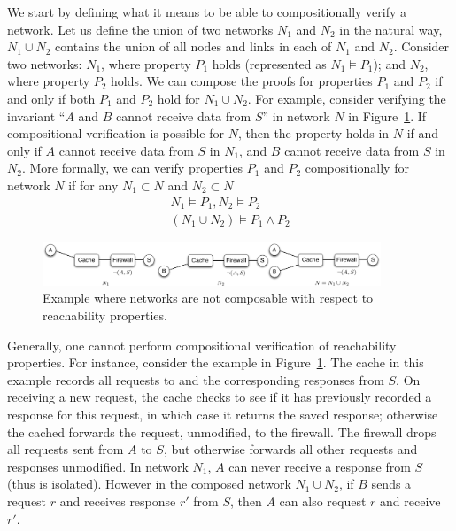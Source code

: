 We start by defining what it means to be able to compositionally verify a network. Let us define the union of two networks $N_1$ and $N_2$ in the natural way, \ie $N_1\cup N_2$ contains the union of all nodes and links in each of $N_1$ and $N_2$. Consider two networks: $N_1$, where property $P_1$ holds (represented as $N_1\models P_1$); and $N_2$, where property $P_2$ holds. We can compose the proofs for properties $P_1$ and $P_2$ if and only if  both $P_1$ and $P_2$ hold for $N_1 \cup N_2$. For example, consider verifying the invariant ``$A$ and $B$ cannot receive data from $S$'' in network $N$ in Figure~\ref{fig:compose_fail}. If compositional verification is possible for $N$, then the property holds in $N$ if and only if $A$ cannot receive data from $S$ in $N_1$, and $B$ cannot receive data from $S$ in $N_2$. More formally, we can verify properties $P_1$ and $P_2$ compositionally for network $N$ if for any $N_1 \subset N$ and $N_2\subset N$
\begin{align*}
N_1 \models P_1,  N_2\models P_2\\
\hline
(N_1 \cup N_2) \models P_1\land P_2
\end{align*}


\begin{figure}[t]
\centering
\includegraphics[width=0.9\textwidth]{figures/rono_example.pdf}
\caption{Example where networks are not composable with respect to reachability properties.}
\label{fig:compose_fail}
\vspace{-0.15in}
\end{figure}

Generally, one cannot perform compositional verification of reachability properties. For instance,
consider the example in Figure~\ref{fig:compose_fail}. The cache in this example records all requests to and the corresponding responses from $S$.
On receiving a new request,  the cache checks to see if it has previously recorded a response for this request, in which case it returns the saved response;
otherwise the cached forwards the request, unmodified, to the firewall. The firewall drops all requests sent from $A$ to $S$, but otherwise forwards all other requests and responses unmodified. In network $N_1$, $A$ can never receive a response from $S$ (thus is isolated). However in the composed network $N_1\cup N_2$, if $B$ sends a request $r$ and receives response $r'$ from $S$, then $A$ can also request $r$ and receive $r'$.

